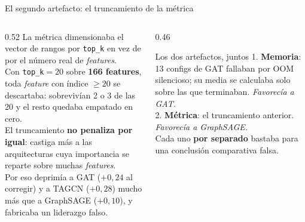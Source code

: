 \documentclass[aspectratio=169,11pt]{beamer}
\begin{document}
\begin{frame}{El segundo artefacto: el truncamiento de la métrica}
\begin{columns}[T]
\begin{column}{0.52\textwidth}
\footnotesize
La métrica dimensionaba el vector de rangos por \texttt{top\_k} en vez de por el número real de \textit{features}.\\[5pt]
Con \texttt{top\_k}$=20$ sobre \textbf{166 features}, toda \textit{feature} con índice $\geq 20$ se descartaba: sobrevivían 2 o 3 de las 20 y el resto quedaba empatado en cero.\\[6pt]
El truncamiento \textbf{no penaliza por igual}: castiga más a las arquitecturas cuya importancia se reparte sobre muchas \textit{features}.\\[4pt]
{\color{muted}Por eso deprimía a GAT ($+0{,}24$ al corregir) y a TAGCN ($+0{,}28$) mucho más que a GraphSAGE ($+0{,}10$), y fabricaba un liderazgo falso.}
\end{column}
\begin{column}{0.46\textwidth}
\begin{block}{Los dos artefactos, juntos}
\footnotesize
1. \textbf{Memoria}: 13 configs de GAT fallaban por OOM silencioso; su media se calculaba solo sobre las que terminaban. \textit{Favorecía a GAT.}\\[4pt]
2. \textbf{Métrica}: el truncamiento anterior. \textit{Favorecía a GraphSAGE.}\\[5pt]
Cada uno \textbf{por separado} bastaba para una conclusión comparativa falsa.
\end{block}
\end{column}
\end{columns}
\end{frame}
\end{document}
